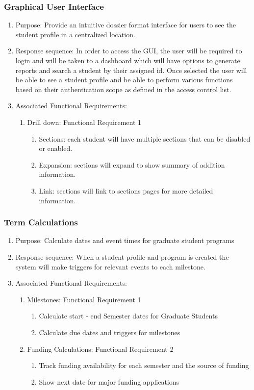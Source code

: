 \documentclass{journal}
\begin{document}
\subsubsection{Graphical User Interface}
\begin{enumerate}
\item Purpose: Provide an intuitive dossier format interface for users to see the student profile in a centralized location.
\item Response sequence: In order to access the GUI, the user will be required to login and will be taken to a dashboard which will have options to generate reports and search a student by their assigned id. Once selected the user will be able to see a student profile and be able to perform various functions based on their authentication scope as defined in the access control list.
\item Associated Functional Requirements:
\begin{enumerate}
\item Drill down: Functional Requirement 1
\begin{enumerate}
\item Sections: each student will have multiple sections that can be disabled or enabled.
\item Expansion: sections will expand to show summary of addition information.
\item Link: sections will link to sections pages for more detailed information.
\end{enumerate}
\end{enumerate}
\end{enumerate}
\subsubsection{Term Calculations}
\begin{enumerate}
\item Purpose: Calculate dates and event times for graduate student programs 
\item Response sequence: When a student profile and program is created the system will make triggers for relevant events to each milestone.
\item Associated Functional Requirements:
\begin{enumerate}
\item Milestones: Functional Requirement 1
\begin{enumerate}
\item Calculate start - end  Semester dates for Graduate Students
\item Calculate due dates and triggers for milestones
\end{enumerate}
\item Funding Calculations: Functional Requirement 2
\begin{enumerate}
\item Track funding availability for each semester and the source of funding
\item Show next date for major funding applications
\end{enumerate}
\end{enumerate}
\end{enumerate}
\end{document}
